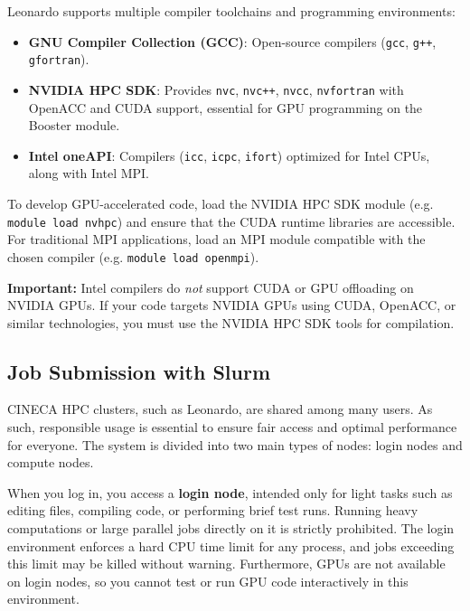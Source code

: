 Leonardo supports multiple compiler toolchains and programming environments:

\begin{itemize}
    \item \textbf{GNU Compiler Collection (GCC)}: Open-source compilers (\texttt{gcc}, \texttt{g++}, \texttt{gfortran}).
    \item \textbf{NVIDIA HPC SDK}: Provides \texttt{nvc}, \texttt{nvc++},  \texttt{nvcc}, \texttt{nvfortran} with OpenACC and CUDA support, essential for GPU programming on the Booster module.
    \item \textbf{Intel oneAPI}: Compilers (\texttt{icc}, \texttt{icpc}, \texttt{ifort}) optimized for Intel CPUs, along with Intel MPI.
\end{itemize}

To develop GPU-accelerated code, load the NVIDIA HPC SDK module (e.g. \texttt{module load nvhpc}) and ensure that the CUDA runtime libraries are accessible. For traditional MPI applications, load an MPI module compatible with the chosen compiler (e.g. \texttt{module load openmpi}).

\begin{warningblock}
    \textbf{Important:} Intel compilers do \emph{not} support CUDA or GPU offloading on NVIDIA GPUs. If your code targets NVIDIA GPUs using CUDA, OpenACC, or similar technologies, you must use the NVIDIA HPC SDK tools for compilation.
\end{warningblock}

\subsection{Job Submission with Slurm}

CINECA HPC clusters, such as Leonardo, are shared among many users. As such, responsible usage is essential to ensure fair access and optimal performance for everyone. The system is divided into two main types of nodes: login nodes and compute nodes.

When you log in, you access a \textbf{login node}, intended only for light tasks such as editing files, compiling code, or performing brief test runs. Running heavy computations or large parallel jobs directly on it is strictly prohibited. The login environment enforces a hard CPU time limit for any process, and jobs exceeding this limit may be killed without warning. Furthermore, GPUs are not available on login nodes, so you cannot test or run GPU code interactively in this environment.

